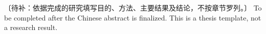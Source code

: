 \zhabstract
〔待补：依据完成的研究填写目的、方法、主要结果及结论，不按章节罗列。〕
\enabstract
To be completed after the Chinese abstract is finalized. This is a thesis template, not a research result.

